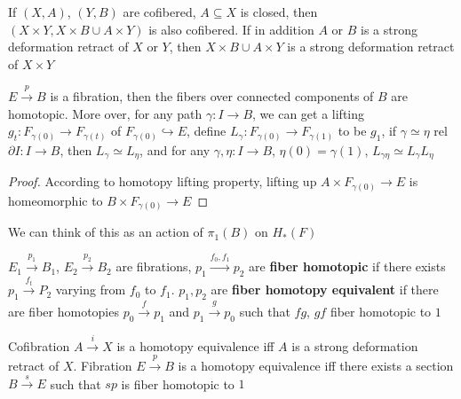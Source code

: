 \documentclass[main]{subfiles}
\begin{document}
\begin{proposition}
If $(X,A)$, $(Y,B)$ are cofibered, $A\subseteq X$ is closed, then $(X\times Y,X\times B\cup A\times Y)$ is also cofibered. If in addition $A$ or $B$ is a strong deformation retract of $X$ or $Y$, then $X\times B\cup A\times Y$ is a strong deformation retract of $X\times Y$
\end{proposition}

\begin{proposition}\label{Fibers of fibration are homotopy equivalent}
$E\xrightarrow{p}B$ is a fibration, then the fibers over connected components of $B$ are homotopic. More over, for any path $\gamma:I\to B$, we can get a lifting $g_t:F_{\gamma(0)}\to F_{\gamma(t)}$ of $F_{\gamma(0)}\hookrightarrow E$, define $L_\gamma:F_{\gamma(0)}\to F_{\gamma(1)}$ to be $g_1$, if $\gamma\simeq\eta$ rel $\partial I : I\to B$, then $L_\gamma\simeq L_\eta$, and for any $\gamma,\eta:I\to B$, $\eta(0)=\gamma(1)$, $L_{\gamma\eta}\simeq L_\gamma L_\eta$
\end{proposition}

\begin{proof}
According to homotopy lifting property, lifting up $A\times F_{\gamma(0)}\to E$ is homeomorphic to $B\times F_{\gamma(0)}\to E$
\end{proof}

\begin{remark}
We can think of this as an action of $\pi_1(B)$ on $H_*(F)$
\end{remark}

\begin{definition}
$E_1\xrightarrow{p_1}B_1$, $E_2\xrightarrow{p_2}B_2$ are fibrations, $p_1\xrightarrow{f_0,f_1} p_2$ are \textbf{fiber homotopic} if there exists $p_1\xrightarrow{f_t} P_2$ varying from $f_0$ to $f_1$. $p_1,p_2$ are \textbf{fiber homotopy equivalent} if there are fiber homotopies $p_0\xrightarrow{f}p_1$ and $p_1\xrightarrow{g}p_0$ such that $fg$, $gf$ fiber homotopic to $1$
\end{definition}

\begin{lemma}\label{i:A->B cofibration is homotopy equivalence iff A strong deformation retract}
Cofibration $A\xrightarrow{i}X$ is a homotopy equivalence iff $A$ is a strong deformation retract of $X$. Fibration $E\xrightarrow{p}B$ is a homotopy equivalence iff there exists a section $B\xrightarrow{s}E$ such that $sp$ is fiber homotopic to $1$
\end{lemma}
\end{document}
